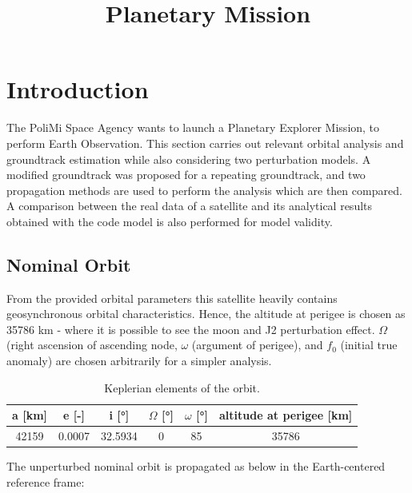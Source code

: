 \documentclass{article}
\title{Planetary Mission}
\begin{document}
	
	
\section{Introduction}
The  PoliMi  Space  Agency  wants  to  launch  a  Planetary  Explorer  Mission,  to  perform  Earth Observation. This section carries out relevant orbital analysis and groundtrack estimation while also considering two perturbation models. A modified groundtrack was proposed for a repeating groundtrack, and two propagation methods are used to perform the analysis which are then compared. A comparison between the real data of a satellite and its analytical results obtained with the code model is also performed for model validity. 

\subsection{Nominal Orbit}

From the provided orbital parameters this satellite heavily contains geosynchronous orbital characteristics. Hence, the altitude at perigee is chosen as 35786 km - where it is possible to see the moon and J2 perturbation effect. $\Omega$ (right ascension of ascending node, $\omega$ (argument of perigee), and $f_0$ (initial true anomaly) are chosen arbitrarily for a simpler analysis.


\begin{table}[ht]
	\centering
	\label{tab:keplerian_elements}
	\begin{tabular}{|c|c|c|c|c|c|}
		\hline
		a [km] & e [-] & i [°] & $\Omega$ [°] & $\omega$ [°] & altitude at perigee [km] \\
		\hline
		42159 & 0.0007 & 32.5934 & 0 & 85 & 35786 \\
		\hline
	\end{tabular}
	\caption{Keplerian elements of the orbit.}
	\label{tab:keplerian_elements of nominal orbit}
\end{table}

The unperturbed nominal orbit is propagated as below in the Earth-centered reference frame:
\end{document}
